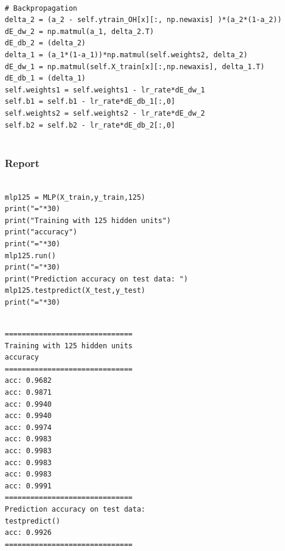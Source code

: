 \documentclass[10pt,a4paper]{article}
\begin{document}
\lstset{%
basicstyle=\small, %
identifierstyle=, %
stringstyle=\ttfamily, %
showstringspaces=false} %
\lstset{language=Python}          %
\begin{lstlisting}[label=nh5-testacc,caption=Back-Propagation]  % Start your code-block

# Backpropagation
delta_2 = (a_2 - self.ytrain_OH[x][:, np.newaxis] )*(a_2*(1-a_2))
dE_dw_2 = np.matmul(a_1, delta_2.T)
dE_db_2 = (delta_2)
delta_1 = (a_1*(1-a_1))*np.matmul(self.weights2, delta_2)
dE_dw_1 = np.matmul(self.X_train[x][:,np.newaxis], delta_1.T)             
dE_db_1 = (delta_1)
self.weights1 = self.weights1 - lr_rate*dE_dw_1
self.b1 = self.b1 - lr_rate*dE_db_1[:,0]    
self.weights2 = self.weights2 - lr_rate*dE_dw_2
self.b2 = self.b2 - lr_rate*dE_db_2[:,0]
   
\end{lstlisting}
 

\clearpage
\subsubsection{Report}


\lstset{%
basicstyle=\small, %
identifierstyle=, %
stringstyle=\ttfamily, %
showstringspaces=false} %
\lstset{language=Python}          %
\begin{lstlisting}[label=nh5-testacc,caption=acc on nH=5]  % Start your code-block

mlp125 = MLP(X_train,y_train,125)
print("="*30)
print("Training with 125 hidden units")
print("accuracy")
print("="*30)
mlp125.run()
print("="*30)
print("Prediction accuracy on test data: ")
mlp125.testpredict(X_test,y_test)
print("="*30)
   
\end{lstlisting}

\begin{verbatim}
==============================
Training with 125 hidden units
accuracy
==============================
acc: 0.9682
acc: 0.9871
acc: 0.9940
acc: 0.9940
acc: 0.9974
acc: 0.9983
acc: 0.9983
acc: 0.9983
acc: 0.9983
acc: 0.9991
==============================
Prediction accuracy on test data: 
testpredict()
acc: 0.9926
==============================
\end{verbatim}
\end{document}
